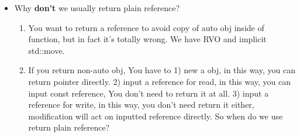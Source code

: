 \documentclass[a4paper,12pt,twoside]{book}
\begin{document}
\begin{itemize}
	\item Why \textbf{don't} we usually return plain reference?
	\begin{enumerate}
		\item You want to return a reference to avoid copy of auto obj inside of function, but in fact it's totally wrong. We have RVO and implicit std::move.

		\item If you return non-auto obj, You have to 1) new a obj, in this way, you can return pointer directly. 2) input a reference for read, in this way, you can input const reference, You don't need to return it at all. 3) input a reference for write, in this way, you don't need return it either, modification will act on inputted reference directly. So when do we use return plain reference?
	\end{enumerate}
	
\end{itemize}
\end{document}

